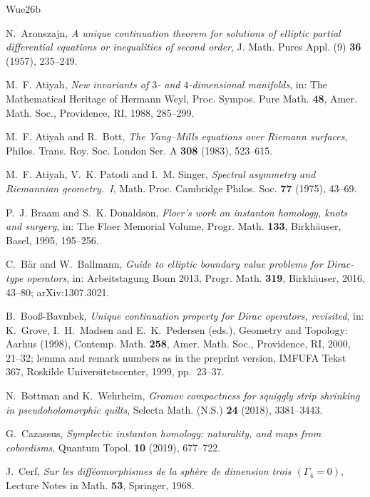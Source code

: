 \documentclass[11pt]{amsart}
\theoremstyle{definition}
\theoremstyle{remark}
\theoremstyle{plain}
\numberwithin{equation}{section}
\begin{document}
\begin{thebibliography}{Wue26b}

N.~Aronszajn, \emph{A unique continuation theorem for solutions of
elliptic partial differential equations or inequalities of second order},
J. Math. Pures Appl. (9) \textbf{36} (1957), 235--249.

M.~F. Atiyah, \emph{New invariants of $3$- and $4$-dimensional manifolds}, in:
The Mathematical Heritage of Hermann Weyl, Proc. Sympos. Pure Math.
\textbf{48}, Amer. Math. Soc., Providence, RI, 1988, 285--299.

M.~F. Atiyah and R.~Bott, \emph{The Yang--Mills equations over Riemann
surfaces}, Philos. Trans. Roy. Soc. London Ser. A \textbf{308} (1983),
523--615.

M.~F. Atiyah, V.~K. Patodi and I.~M. Singer, \emph{Spectral asymmetry and
Riemannian geometry.~I}, Math. Proc. Cambridge Philos. Soc. \textbf{77} (1975),
43--69.

P.~J. Braam and S.~K. Donaldson, \emph{Floer's work on instanton homology,
knots and surgery}, in: The Floer Memorial Volume, Progr. Math. \textbf{133},
Birkh\"auser, Basel, 1995, 195--256.

C.~B\"ar and W.~Ballmann, \emph{Guide to elliptic boundary value problems
for Dirac-type operators}, in: Arbeitstagung Bonn 2013, Progr. Math.
\textbf{319}, Birkh\"auser, 2016, 43--80; arXiv:1307.3021.

B.~Boo{\ss}-Bavnbek, \emph{Unique continuation property for Dirac operators, revisited}, in:
K.~Grove, I.~H.~Madsen and E.~K.~Pedersen (eds.), Geometry and Topology: Aarhus (1998), Contemp.
Math. \textbf{258}, Amer. Math. Soc., Providence, RI, 2000, 21--32; lemma and remark numbers as in the
preprint version, IMFUFA Tekst 367, Roskilde Universitetscenter, 1999, pp.~23--37.

N.~Bottman and K.~Wehrheim, \emph{Gromov compactness for squiggly strip
shrinking in pseudoholomorphic quilts}, Selecta Math. (N.S.) \textbf{24}
(2018), 3381--3443.

G.~Cazassus, \emph{Symplectic instanton homology: naturality, and maps from
cobordisms}, Quantum Topol. \textbf{10} (2019), 677--722.

J.~Cerf, \emph{Sur les diff\'eomorphismes de la sph\`ere de dimension
trois $(\Gamma_4=0)$}, Lecture Notes in Math. \textbf{53}, Springer, 1968.


\end{thebibliography}
\end{document}
